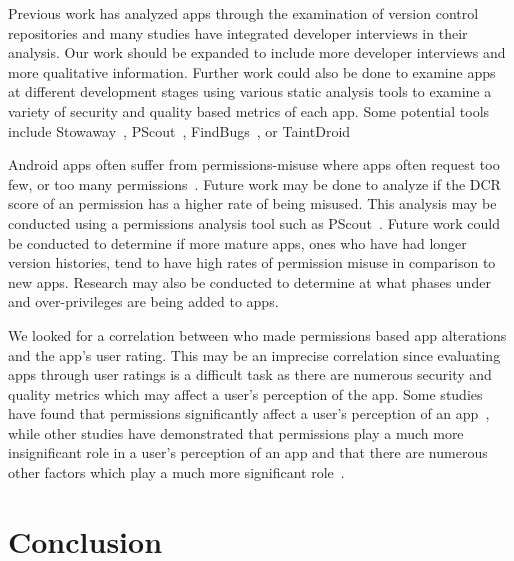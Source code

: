 \documentclass{sig-alternate-05-2015}
\newcommand{\todo}[1]{\textcolor{cyan}{\textbf{[#1]}}}
\begin{document}
Previous work has analyzed apps through the examination of version control repositories and many studies have integrated developer interviews in their analysis. Our work should be expanded to include more developer interviews and more qualitative information. Further work could also be done to examine apps at different development stages using various static analysis tools  to examine a variety of security and quality based metrics of each app. Some potential tools include Stowaway~\cite{Felt:2011:APD:2046707.2046779}, PScout~\cite{Au:2012:PAA:2382196.2382222}, FindBugs~\cite{findbugs_key}, or TaintDroid~\cite{Enck:2010:TIT:1924943.1924971}


Android apps often suffer from permissions-misuse where apps often request too few, or too many permissions~\cite{Grace:2012:UEA:2185448.2185464, Felt:2011:APD:2046707.2046779}. Future work may be done to analyze if the DCR score of an permission has a higher rate of being misused. This analysis may be conducted using a permissions analysis tool such as PScout~\cite{Au:2012:PAA:2382196.2382222}. Future work could be conducted to determine if more mature apps, ones who have had longer version histories, tend to have high rates of permission misuse in comparison to new apps. Research may also be conducted to determine at what phases under and over-privileges are being added to apps.


We looked for a correlation between who made permissions based app alterations and the app's user rating. This may be an imprecise correlation since evaluating apps through user ratings is a difficult task as there are numerous security and quality metrics which may affect a user's perception of the app. Some studies have found that permissions significantly affect a user's perception of an app~\cite{Lin:2012:EPU:2370216.2370290}, while other studies have demonstrated that permissions play a much more insignificant role in a user's perception of an app and that there are numerous other factors which play a much more significant role~\cite{Kelley:2012:CPI:2426020.2426027, Felt:2012:APU:2335356.2335360}.




\section{Conclusion}
\label{sec: conclusion}
\end{document}
